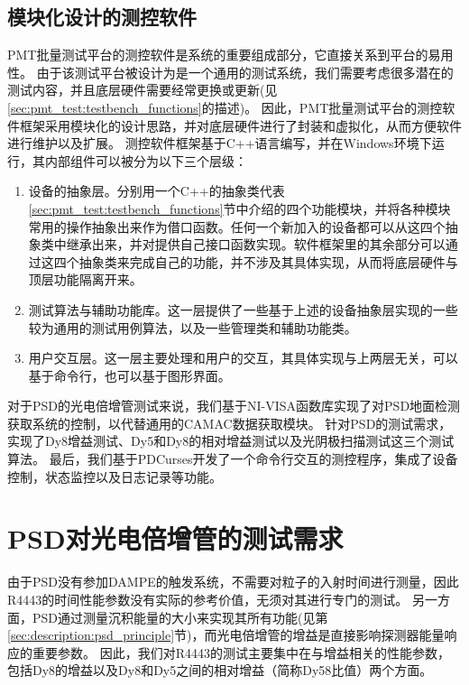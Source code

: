 \subsection{模块化设计的测控软件}
\label{sec:pmt_test:software}
PMT批量测试平台的测控软件是系统的重要组成部分，它直接关系到平台的易用性。
由于该测试平台被设计为是一个通用的测试系统，我们需要考虑很多潜在的测试内容，并且底层硬件需要经常更换或更新(见\ref{sec:pmt_test:testbench_functions}的描述)。
因此，PMT批量测试平台的测控软件框架采用模块化的设计思路，并对底层硬件进行了封装和虚拟化，从而方便软件进行维护以及扩展。
测控软件框架基于C++语言编写，并在Windows环境下运行，其内部组件可以被分为以下三个层级：
\begin{enumerate}
	\item 设备的抽象层。分别用一个C++的抽象类代表\ref{sec:pmt_test:testbench_functions}节中介绍的四个功能模块，并将各种模块常用的操作抽象出来作为借口函数。任何一个新加入的设备都可以从这四个抽象类中继承出来，并对提供自己接口函数实现。软件框架里的其余部分可以通过这四个抽象类来完成自己的功能，并不涉及其具体实现，从而将底层硬件与顶层功能隔离开来。
	\item 测试算法与辅助功能库。这一层提供了一些基于上述的设备抽象层实现的一些较为通用的测试用例算法，以及一些管理类和辅助功能类。
	\item 用户交互层。这一层主要处理和用户的交互，其具体实现与上两层无关，可以基于命令行，也可以基于图形界面。
\end{enumerate}
对于PSD的光电倍增管测试来说，我们基于NI-VISA\parencite{ni_visa}函数库实现了对PSD地面检测获取系统的控制，以代替通用的CAMAC数据获取模块。
针对PSD的测试需求，实现了Dy8增益测试、Dy5和Dy8的相对增益测试以及光阴极扫描测试这三个测试算法。
最后，我们基于PDCurses\parencite{pdcurses}开发了一个命令行交互的测控程序，集成了设备控制，状态监控以及日志记录等功能。

\section{PSD对光电倍增管的测试需求}
\label{sec:pmt_test:test_requirement}
由于PSD没有参加DAMPE的触发系统，不需要对粒子的入射时间进行测量，因此R4443的时间性能参数没有实际的参考价值，无须对其进行专门的测试。
另一方面，PSD通过测量沉积能量的大小来实现其所有功能(见第\ref{sec:description:psd_principle}节)，而光电倍增管的增益是直接影响探测器能量响应的重要参数。
因此，我们对R4443的测试主要集中在与增益相关的性能参数，包括Dy8的增益以及Dy8和Dy5之间的相对增益（简称Dy58比值）两个方面。

